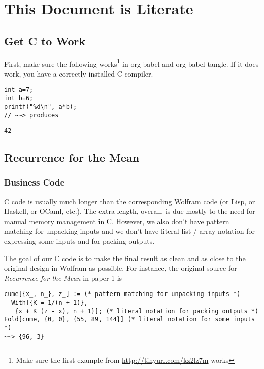 \documentclass[10pt,oneside,x11names]{article}
\begin{document}
\section{This Document is Literate}
\label{sec:orgheadline15}
\subsection{Get C to Work}
\label{sec:orgheadline3}

First, make sure the following works\footnote{Make sure the first example from \url{http://tinyurl.com/kz2lz7m} works} in org-babel and org-babel tangle. If it
does work, you have a correctly installed C compiler.

\begin{verbatim}
int a=7;
int b=6;
printf("%d\n", a*b);
// ~~> produces
\end{verbatim}

\begin{verbatim}
42
\end{verbatim}

\subsection{Recurrence for the Mean}
\label{sec:orgheadline11}
\subsubsection{Business Code}
\label{sec:orgheadline4}

C code is usually much longer than the corresponding Wolfram code (or Lisp, or
Haskell, or OCaml, etc.). The extra length, overall, is due mostly to the need
for manual memory management in C. However, we also don't have pattern matching
for unpacking inputs and we don't have literal list / array notation for
expressing some inputs and for packing outputs.

The goal of our C code is to make the final result as clean and as close to the
original design in Wolfram as possible. For instance, the original source for
\emph{Recurrence for the Mean} in paper 1\footnotemark[1]{} is

\begin{verbatim}
cume[{x_, n_}, z_] := (* pattern matching for unpacking inputs *)
  With[{K = 1/(n + 1)},
   {x + K (z - x), n + 1}]; (* literal notation for packing outputs *)
Fold[cume, {0, 0}, {55, 89, 144}] (* literal notation for some inputs *)
~~> {96, 3}
\end{verbatim}
\end{document}
